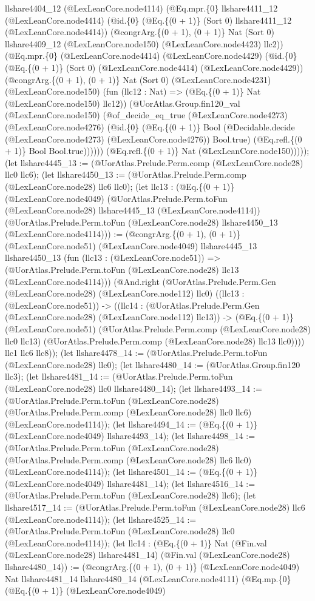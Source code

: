 \documentclass[11pt]{article}
\begin{document}
llshare4404\_12 (@LexLeanCore.node4114) (@Eq.mpr.\{0\} llshare4411\_12 (@LexLeanCore.node4414) (@id.\{0\} (@Eq.\{(0 + 1)\} (Sort 0) llshare4411\_12 (@LexLeanCore.node4414)) (@congrArg.\{(0 + 1), (0 + 1)\} Nat (Sort 0) llshare4409\_12 (@LexLeanCore.node150) (@LexLeanCore.node4423) llc2)) (@Eq.mpr.\{0\} (@LexLeanCore.node4414) (@LexLeanCore.node4429) (@id.\{0\} (@Eq.\{(0 + 1)\} (Sort 0) (@LexLeanCore.node4414) (@LexLeanCore.node4429)) (@congrArg.\{(0 + 1), (0 + 1)\} Nat (Sort 0) (@LexLeanCore.node4231) (@LexLeanCore.node150) (fun (llc12 : Nat) => (@Eq.\{(0 + 1)\} Nat (@LexLeanCore.node150) llc12)) (@UorAtlas.Group.fin120\_val (@LexLeanCore.node150) (@of\_decide\_eq\_true (@LexLeanCore.node4273) (@LexLeanCore.node4276) (@id.\{0\} (@Eq.\{(0 + 1)\} Bool (@Decidable.decide (@LexLeanCore.node4273) (@LexLeanCore.node4276)) Bool.true) (@Eq.refl.\{(0 + 1)\} Bool Bool.true)))))) (@Eq.refl.\{(0 + 1)\} Nat (@LexLeanCore.node150))))); (let llshare4445\_13 := (@UorAtlas.Prelude.Perm.comp (@LexLeanCore.node28) llc0 llc6); (let llshare4450\_13 := (@UorAtlas.Prelude.Perm.comp (@LexLeanCore.node28) llc6 llc0); (let llc13 : (@Eq.\{(0 + 1)\} (@LexLeanCore.node4049) (@UorAtlas.Prelude.Perm.toFun (@LexLeanCore.node28) llshare4445\_13 (@LexLeanCore.node4114)) (@UorAtlas.Prelude.Perm.toFun (@LexLeanCore.node28) llshare4450\_13 (@LexLeanCore.node4114))) := (@congrArg.\{(0 + 1), (0 + 1)\} (@LexLeanCore.node51) (@LexLeanCore.node4049) llshare4445\_13 llshare4450\_13 (fun (llc13 : (@LexLeanCore.node51)) => (@UorAtlas.Prelude.Perm.toFun (@LexLeanCore.node28) llc13 (@LexLeanCore.node4114))) (@And.right (@UorAtlas.Prelude.Perm.Gen (@LexLeanCore.node28) (@LexLeanCore.node112) llc0) ((llc13 : (@LexLeanCore.node51)) -> ((llc14 : (@UorAtlas.Prelude.Perm.Gen (@LexLeanCore.node28) (@LexLeanCore.node112) llc13)) -> (@Eq.\{(0 + 1)\} (@LexLeanCore.node51) (@UorAtlas.Prelude.Perm.comp (@LexLeanCore.node28) llc0 llc13) (@UorAtlas.Prelude.Perm.comp (@LexLeanCore.node28) llc13 llc0)))) llc1 llc6 llc8)); (let llshare4478\_14 := (@UorAtlas.Prelude.Perm.toFun (@LexLeanCore.node28) llc0); (let llshare4480\_14 := (@UorAtlas.Group.fin120 llc3); (let llshare4481\_14 := (@UorAtlas.Prelude.Perm.toFun (@LexLeanCore.node28) llc0 llshare4480\_14); (let llshare4493\_14 := (@UorAtlas.Prelude.Perm.toFun (@LexLeanCore.node28) (@UorAtlas.Prelude.Perm.comp (@LexLeanCore.node28) llc0 llc6) (@LexLeanCore.node4114)); (let llshare4494\_14 := (@Eq.\{(0 + 1)\} (@LexLeanCore.node4049) llshare4493\_14); (let llshare4498\_14 := (@UorAtlas.Prelude.Perm.toFun (@LexLeanCore.node28) (@UorAtlas.Prelude.Perm.comp (@LexLeanCore.node28) llc6 llc0) (@LexLeanCore.node4114)); (let llshare4501\_14 := (@Eq.\{(0 + 1)\} (@LexLeanCore.node4049) llshare4481\_14); (let llshare4516\_14 := (@UorAtlas.Prelude.Perm.toFun (@LexLeanCore.node28) llc6); (let llshare4517\_14 := (@UorAtlas.Prelude.Perm.toFun (@LexLeanCore.node28) llc6 (@LexLeanCore.node4114)); (let llshare4525\_14 := (@UorAtlas.Prelude.Perm.toFun (@LexLeanCore.node28) llc0 (@LexLeanCore.node4114)); (let llc14 : (@Eq.\{(0 + 1)\} Nat (@Fin.val (@LexLeanCore.node28) llshare4481\_14) (@Fin.val (@LexLeanCore.node28) llshare4480\_14)) := (@congrArg.\{(0 + 1), (0 + 1)\} (@LexLeanCore.node4049) Nat llshare4481\_14 llshare4480\_14 (@LexLeanCore.node4111) (@Eq.mp.\{0\} (@Eq.\{(0 + 1)\} (@LexLeanCore.node4049) 
\end{document}
